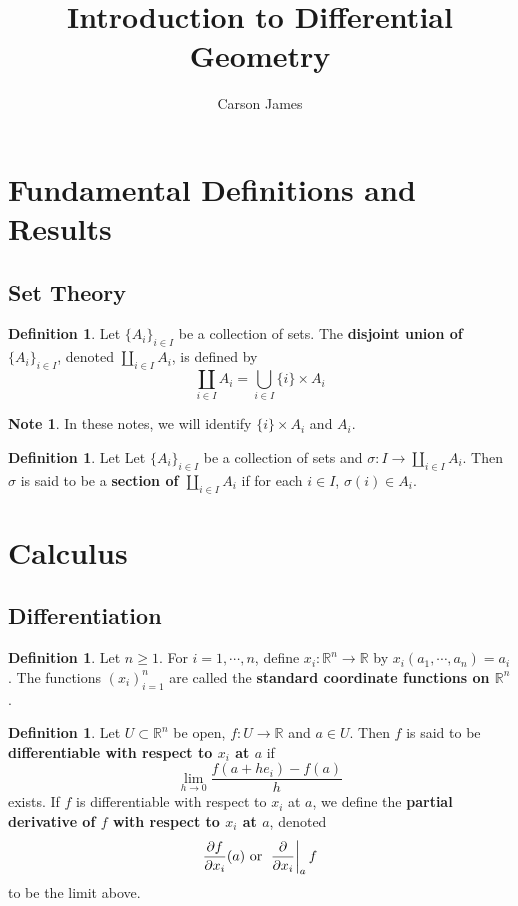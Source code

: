\documentclass[12pt]{amsart}
\theoremstyle{definition}
\newtheorem{defn}[definition]{Definition}
\newtheorem{note}[definition]{Note}
\theoremstyle{definition}
\newcommand{\sig}{\sigma}
\newcommand{\R}{\mathbb{R}}
\begin{document}
	
	\title{Introduction to Differential Geometry}
	\author{Carson James}
	\maketitle
	
	\tableofcontents
	
	\section{Fundamental Definitions and Results}

	\subsection{Set Theory}
	
	\begin{defn}
		Let $\{A_i\}_{i \in I}$ be a collection of sets. The \textbf{disjoint union of} $\{A_i\}_{i \in I}$, denoted $\coprod\limits_{i \in I} A_i$, is defined by $$\coprod_{i \in I}A_i = \bigcup_{i\in I} \{i\} \times A_i$$ 
	\end{defn}

	\begin{note}
		In these notes, we will identify $\{i\} \times A_i$ and $A_i$.
	\end{note}

	\begin{defn}
		Let Let $\{A_i\}_{i \in I}$ be a collection of sets and $\sig: I \rightarrow \coprod\limits_{i \in I} A_i$. Then $\sig$ is said to be a \textbf{section of $\coprod\limits_{i \in I} A_i$} if for each $i \in I$, $\sig(i) \in A_i$.
	\end{defn}
	
	\section{Calculus}
	
	\subsection{Differentiation}
	
	\begin{defn}
		Let $n \geq 1$. For $i = 1, \cdots, n$, define $x_i: \R^n \rightarrow \R$ by $x_i(a_1, \cdots, a_n) = a_i$. The functions $(x_i)_{i=1}^n$ are called the \textbf{standard coordinate functions on $\R^n$}. 
	\end{defn}
	
	\begin{defn} 
		Let $U \subset \R^n$ be open, $f: U \rightarrow \R$ and $a \in U$. Then $f$ is said to be \textbf{differentiable with respect to $x_i$ at $a$} if $$\lim\limits_{h \rightarrow 0} \frac{f(a + he_i) - f(a)}{h}$$ exists. If $f$ is differentiable with respect to $x_i$ at $a$, we define the \textbf{partial derivative of $f$ with respect to $x_i$ at $a$}, denoted $$\frac{\partial f}{\partial x_i} (a) \text{ or } \eval{\pdv{x_i}}_{a} f $$ to be the limit above.
		
	\end{defn}
		
\end{document}
